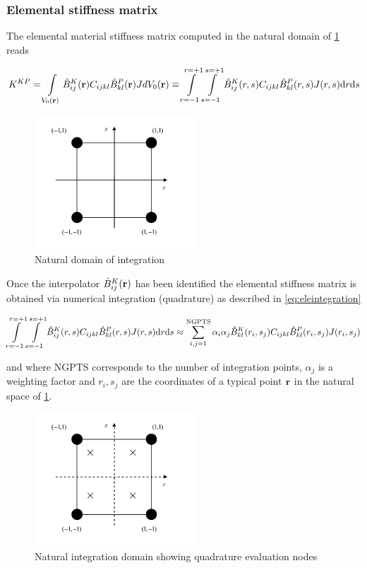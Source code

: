 \subsubsection*{Elemental stiffness matrix}
The elemental material stiffness matrix computed in the natural domain of \cref{fig:Nat domain} reads

\begin{equation}
K^{KP}=\int\limits_{V_0(\vb{r})} \hat{B}_{ij}^K(\vb{r}) C_{ijkl} \hat{B}_{kl}^P(\vb{r})J dV_0(\vb{r})\equiv \int\limits_{r=-1}^{r=+1}\int\limits_{s=-1}^{s=+1} \hat{B}_{ij}^K(r,s) C_{ijkl} \hat{B}_{kl}^P(r,s)J(r,s) \mathrm{d}r\mathrm{d}s
\label{eq:elematrix}
\end{equation}



\begin{figure}[h]
\centering
\includegraphics[width=6cm]{figure3.pdf}
\caption{Natural domain of integration}
\label{fig:Nat domain}
\end{figure}
 

Once the interpolator $\hat{B}_{ij}^K(\vb{r})$ has been identified the elemental stiffness matrix is obtained via numerical integration (quadrature) as described in \eqref{eq:eleintegration}

\begin{equation}
\int\limits_{r=-1}^{r=+1}\int\limits_{s=-1}^{s=+1} \hat{B}_{ij}^K(r,s) C_{ijkl} \hat{B}_{kl}^P(r,s)J(r,s) \mathrm{d}r\mathrm{d}s\approx \sum_{i,j=1}^\text{NGPTS} \alpha_i \alpha_j \hat{B}_{kl}^K(r_i,s_j)C_{ijkl} \hat{B}_{kl}^P(r_i,s_j) J(r_i,s_j)
\label{eq:eleintegration}
\end{equation}


and where NGPTS corresponds to the number of integration points, $\alpha_j$ is a weighting factor and $r_i,s_j$   are the coordinates of a typical point $\vb{r}$ in the natural space of \cref{fig:Nat domain}.

 
\begin{figure}[h]
\centering
\includegraphics[width=6cm]{figure4.pdf}
\caption{Natural integration domain showing quadrature evaluation nodes}
\label{fig:integration domain}
\end{figure}	 


